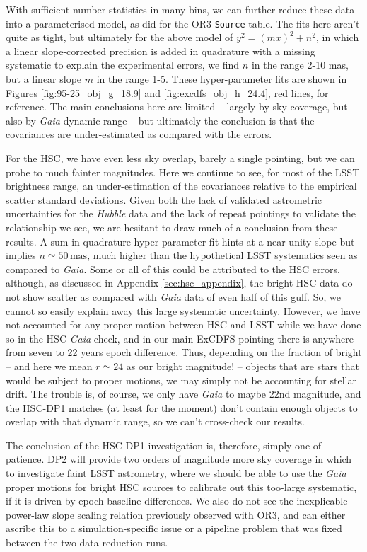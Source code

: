 \documentclass[SE,lsstdraft,authoryear,toc]{lsstdoc}
\begin{document}
With sufficient number statistics in many bins, we can further reduce these data into a parameterised model, as \citet{sitcomtn-159} did for the OR3 \texttt{Source} table.
The fits here aren't quite as tight, but ultimately for the above model of $y^2 = (mx)^2 + n^2$, in which a linear slope-corrected precision is added in quadrature with a missing systematic to explain the experimental errors, we find $n$ in the range 2-10 mas, but a linear slope $m$ in the range 1-5.
These hyper-parameter fits are shown in Figures \ref{fig:95-25_obj_g_18.9} and \ref{fig:excdfs_obj_h_24.4}, red lines, for reference.
The main conclusions here are limited -- largely by sky coverage, but also by \textit{Gaia} dynamic range -- but ultimately the conclusion is that the covariances are under-estimated as compared with the errors.

For the HSC, we have even less sky overlap, barely a single pointing, but we can probe to much fainter magnitudes.
Here we continue to see, for most of the LSST brightness range, an under-estimation of the covariances relative to the empirical scatter standard deviations.
Given both the lack of validated astrometric uncertainties for the \textit{Hubble} data and the lack of repeat pointings to validate the relationship we see, we are hesitant to draw much of a conclusion from these results.
A sum-in-quadrature hyper-parameter fit hints at a near-unity slope but implies $n \simeq 50\,\mathrm{mas}$, much higher than the hypothetical LSST systematics seen as compared to \textit{Gaia}.
Some or all of this could be attributed to the HSC errors, although, as discussed in Appendix \ref{sec:hsc_appendix}, the bright HSC data do not show scatter as compared with \textit{Gaia} data of even half of this gulf.
So, we cannot so easily explain away this large systematic uncertainty.
However, we have not accounted for any proper motion between HSC and LSST while we have done so in the HSC-\textit{Gaia} check, and in our main ExCDFS pointing there is anywhere from seven to 22 years epoch difference.
Thus, depending on the fraction of bright -- and here we mean $r \simeq 24$ as our bright magnitude! -- objects that are stars that would be subject to proper motions, we may simply not be accounting for stellar drift.
The trouble is, of course, we only have \textit{Gaia} to maybe 22nd magnitude, and the HSC-DP1 matches (at least for the moment) don't contain enough objects to overlap with that dynamic range, so we can't cross-check our results.

The conclusion of the HSC-DP1 investigation is, therefore, simply one of patience.
DP2 will provide two orders of magnitude more sky coverage in which to investigate faint LSST astrometry, where we should be able to use the \textit{Gaia} proper motions for bright HSC sources to calibrate out this too-large systematic, if it is driven by epoch baseline differences.
We also do not see the inexplicable power-law slope scaling relation previously observed with OR3, and can either ascribe this to a simulation-specific issue or a pipeline problem that was fixed between the two data reduction runs.
\end{document}
